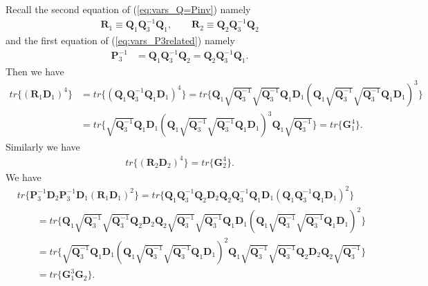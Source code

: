\documentclass[12pt]{article}
\begin{document}
Recall the second equation of (\ref{eq:vars_Q=Pinv}) namely
\begin{align*}
\mathbf{R}_1 \equiv \mathbf{Q}_1 \mathbf{Q}_3^{-1} \mathbf{Q}_1, \qquad \mathbf{R}_2 \equiv \mathbf{Q}_2 \mathbf{Q}_3^{-1} \mathbf{Q}_2
\end{align*}
and the first equation of (\ref{eq:vars_P3related}) namely
\begin{align*}
\mathbf{P}_3^{-1} & = \mathbf{Q}_1 \mathbf{Q}_3^{-1} \mathbf{Q}_2 = \mathbf{Q}_2 \mathbf{Q}_3^{-1} \mathbf{Q}_1.
\end{align*}
Then we have
\begin{align}  \label{eq:dif4_F1_a}
tr\{ (\mathbf{R}_1 \mathbf{D}_1)^4 \} &= tr\{ (\mathbf{Q}_1 \mathbf{Q}_3^{-1} \mathbf{Q}_1 \mathbf{D}_1)^4 \} = tr\{ \mathbf{Q}_1 \sqrt{\mathbf{Q}_3^{-1}} \sqrt{\mathbf{Q}_3^{-1}} \mathbf{Q}_1 \mathbf{D}_1 (\mathbf{Q}_1 \sqrt{\mathbf{Q}_3^{-1}} \sqrt{\mathbf{Q}_3^{-1}} \mathbf{Q}_1 \mathbf{D}_1)^3 \}  \nonumber \\
  &= tr\{ \sqrt{\mathbf{Q}_3^{-1}} \mathbf{Q}_1 \mathbf{D}_1 (\mathbf{Q}_1 \sqrt{\mathbf{Q}_3^{-1}} \sqrt{\mathbf{Q}_3^{-1}} \mathbf{Q}_1 \mathbf{D}_1)^3 \mathbf{Q}_1 \sqrt{\mathbf{Q}_3^{-1}} \} = tr\{ \mathbf{G}_1^4 \}.
\end{align}
Similarly we have
\begin{align}  \label{eq:dif4_F1_b}
tr\{ (\mathbf{R}_2 \mathbf{D}_2)^4 \} = tr\{ \mathbf{G}_2^4 \}.
\end{align}
We have
\begin{align}  \label{eq:dif4_F1_c}
& tr\{ \mathbf{P}_3^{-1} \mathbf{D}_2 \mathbf{P}_3^{-1} \mathbf{D}_1 (\mathbf{R}_1 \mathbf{D}_1)^2 \} = tr\{ \mathbf{Q}_1 \mathbf{Q}_3^{-1} \mathbf{Q}_2 \mathbf{D}_2 \mathbf{Q}_2 \mathbf{Q}_3^{-1} \mathbf{Q}_1 \mathbf{D}_1 (\mathbf{Q}_1 \mathbf{Q}_3^{-1} \mathbf{Q}_1 \mathbf{D}_1)^2 \}  \nonumber \\
& \qquad = tr\{ \mathbf{Q}_1 \sqrt{\mathbf{Q}_3^{-1}} \sqrt{\mathbf{Q}_3^{-1}} \mathbf{Q}_2 \mathbf{D}_2 \mathbf{Q}_2 \sqrt{\mathbf{Q}_3^{-1}} \sqrt{\mathbf{Q}_3^{-1}} \mathbf{Q}_1 \mathbf{D}_1 (\mathbf{Q}_1 \sqrt{\mathbf{Q}_3^{-1}} \sqrt{\mathbf{Q}_3^{-1}} \mathbf{Q}_1 \mathbf{D}_1)^2 \}  \nonumber \\
& \qquad = tr\{ \sqrt{\mathbf{Q}_3^{-1}} \mathbf{Q}_1 \mathbf{D}_1 (\mathbf{Q}_1 \sqrt{\mathbf{Q}_3^{-1}} \sqrt{\mathbf{Q}_3^{-1}} \mathbf{Q}_1 \mathbf{D}_1)^2 \mathbf{Q}_1 \sqrt{\mathbf{Q}_3^{-1}} \sqrt{\mathbf{Q}_3^{-1}} \mathbf{Q}_2 \mathbf{D}_2 \mathbf{Q}_2 \sqrt{\mathbf{Q}_3^{-1}} \}  \nonumber \\
& \qquad = tr\{ \mathbf{G}_1^3 \mathbf{G}_2 \}.
\end{align}
\end{document}
